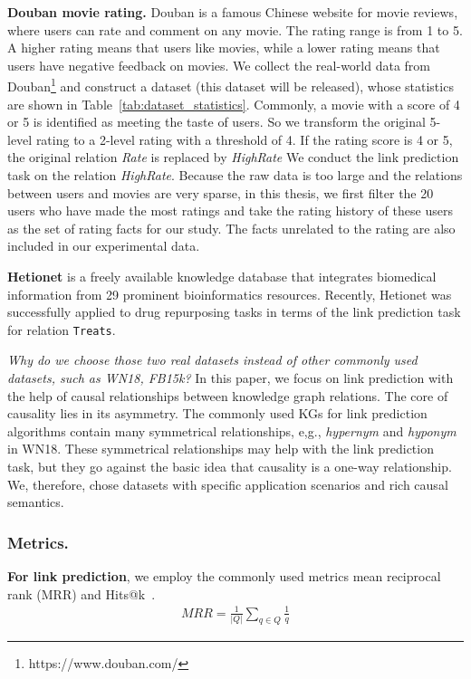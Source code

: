 %


\noindent
{\bf Douban movie rating.}
Douban is a famous Chinese website for movie reviews, where users can rate and comment on any movie.
The rating range is from 1 to 5. A higher rating means that users like movies, while a lower rating means that users have negative feedback on movies.
We collect the real-world data from Douban\footnote{https://www.douban.com/} and construct a dataset (this dataset will be released), whose statistics are shown in Table~\ref{tab:dataset_statistics}.
Commonly, a movie with a score of 4 or 5 is identified as meeting the taste of users.
So we transform the original 5-level rating to a 2-level rating with a threshold of 4.
If the rating score is 4 or 5, the original relation \textit{Rate} is replaced by  \textit{HighRate}
We conduct the link prediction task on the relation \textit{HighRate}.
Because the raw data is too large and the relations between users and movies are very sparse, in this thesis, we first filter the 20 users who have made the most ratings and take the rating history of these users as the set of rating facts for our study.
The facts unrelated to the rating are also included in our experimental data.

\noindent
{\bf Hetionet}\cite{himmelstein2017systematic}
is a freely available knowledge database that integrates biomedical information from 29 prominent
bioinformatics resources.
Recently, Hetionet was successfully applied to drug repurposing tasks in terms of the link prediction task for relation \texttt{Treats}\cite{himmelstein2017systematic, ratajczak2022task}.

\textit{Why do we choose those two real datasets instead of other commonly used datasets, such as WN18, FB15k?}
In this paper, we focus on link prediction with the help of causal relationships between knowledge graph relations.
The core of causality lies in its asymmetry.
The commonly used KGs for link prediction algorithms contain many symmetrical relationships, e,g., \textit{hypernym} and \textit{hyponym} in WN18.
These symmetrical relationships may help with the link prediction task, but they go against the basic idea that causality is a one-way relationship.
We, therefore, chose datasets with specific application scenarios and rich causal semantics.

\subsubsection{\textbf{Metrics.}}
\textbf{For link prediction}, we employ the commonly used metrics mean reciprocal rank (MRR) and Hits@k~\cite{rossi2021knowledge,balazevic2019tucker,bordes2013translating}.
\begin{equation}
\label{eq:mrr}
\begin{aligned}
M R R=\frac{1}{|Q|} \sum_{q \in Q} \frac{1}{q}
\end{aligned}
\end{equation}

